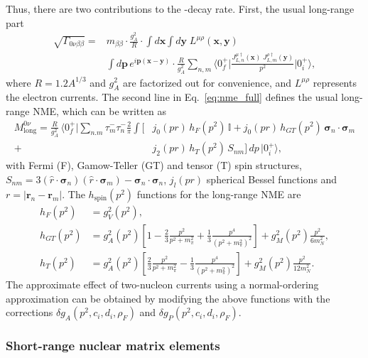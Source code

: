 Thus, there are two contributions to the \bbonu-decay rate. First, the usual long-range part~\cite{Engel:2016xgb}
\begin{align}
\label{eq:nme_full}
  \sqrt{\Gamma_{0\nu\beta\beta}} = & m_{\beta\beta}  \cdot \frac{g_A^2}{R} \cdot    \!\int \!d\bm x \!\int \!d\bm y \;L^{\mu\rho}(\bm x, \bm y) 
  \nonumber \\ & \int \!d\bm p\,e^{i\bm p({\bm x -\bm y})}\cdot 
  \frac{R}{g_A^2} \sum_{n,m}
  \langle 0^+_f\rvert
  \frac{{J}_{L,n}^{\mu\dagger} ({\bm x})\;{J}_{L,m}^{\rho\dagger}({\bm y})}{{ p}^2}
  \lvert 0^+_i\rangle,
\end{align}
where $R=1.2A^{1/3}$ and $g_A^2$ are factorized out for convenience, and $L^{\mu\rho}$ represents the electron currents. The second line in Eq.~\eqref{eq:nme_full} defines the usual long-range NME, which can be written as
\begin{align}
\label{eq:nme}
  M^{0\nu}_\text{long} = \frac{R}{g_A^2}\,
  \langle 0^+_f\rvert
  \sum_{n.m}
  \tau^-_m\tau^-_n \frac{2}{\pi}\int \big[
    &j_0(pr)\,h_F(p^2)\,\mathbb{I}+j_0(pr)\,h_{GT}(p^2)\,{\bm \sigma}_n\cdot{\bm \sigma}_m \nonumber \\
    +&j_2(pr)\,h_T(p^2)\,S_{nm}
    \big]\,d p\,
  \lvert 0^+_i\rangle, %
\end{align}
with Fermi (F), Gamow-Teller (GT) and tensor (T) spin structures, $S_{nm}=3({\hat r}\cdot{\bm \sigma}_n)({\hat r}\cdot{\bm \sigma}_m)-{\bm \sigma}_n\cdot{\bm \sigma}_n$, $j_l(pr)$ spherical Bessel functions and $r=\lvert{\bm r}_n-{\bm r}_m\rvert$. The $h_\text{spin}(p^2)$ functions for the long-range NME are
\begin{align}
\label{eq:nu_potentials_explicit}
h_{F}(p^2)&=g_V^2(p^2), \nonumber \\
h_{GT}(p^2)&=g_A^2(p^2)\left[1-\frac{2}{3}\frac{p^2}{p^2+m_\pi^2}+\frac{1}{3}\frac{p^4}{(p^2+m_\pi^2)^2}\right]+g_M^2(p^2)\frac{p^2}{6m_N^2}, \nonumber \\
h_{T}(p^2)&=g_A^2(p^2)\left[\frac{2}{3}\frac{p^2}{p^2+m_\pi^2}-\frac{1}{3}\frac{p^4}{(p^2+m_\pi^2)^2}\right]+g_M^2(p^2)\frac{p^2}{12m_N^2}.
\end{align}
The approximate effect of two-nucleon currents using a normal-ordering approximation can be obtained by modifying the above functions with the corrections $\delta g_A(p^2,c_i,d_i,\rho_F)$ and $\delta g_P(p^2,c_i,d_i,\rho_F)$.

\subsubsection{Short-range nuclear matrix elements}

